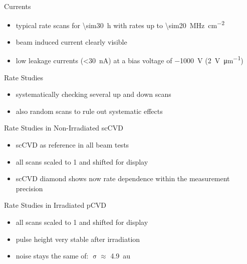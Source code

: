 \begin{frame}{Currents}
 
	\vspace*{-15pt}
	
	\begin{itemize} \itemfill
		\item typical rate scans for \SI{\sim30}{\hour} with rates up to \SI{\sim20}{\mega\hertz\per\centi\meter^2}
		\item beam induced current clearly visible
		\item low leakage currents (\SI{<30}{\nano\ampere}) at a bias voltage of \SI{-1000}{\volt} (\SI{2}{\volt\per\micro m})
	\end{itemize}
 
\end{frame}
\begin{frame}{Rate Studies}

	
	\vspace*{-15pt}
	
	\begin{itemize}
		\item systematically checking several up and down scans
		\item also random scans to rule out systematic effects 
	\end{itemize}
	
\end{frame}
\begin{frame}{Rate Studies in Non-Irradiated scCVD}

	
	\vspace*{-15pt}
	
	\begin{itemize}
		\item scCVD as reference in all beam tests
		\item all scans scaled to 1 and shifted for display
		\item scCVD diamond shows now rate dependence within the measurement precision
	\end{itemize}
	
\end{frame}
\begin{frame}{Rate Studies in Irradiated pCVD}

	\vspace*{-15pt}
	
	\begin{itemize}
		\itemfill
		\item all scans scaled to 1 and shifted for display
		\item pulse height very stable after irradiation
		\item noise stays the same of: $\upsigma \approx$ \SI{4.9}{au}
	\end{itemize}

\end{frame}